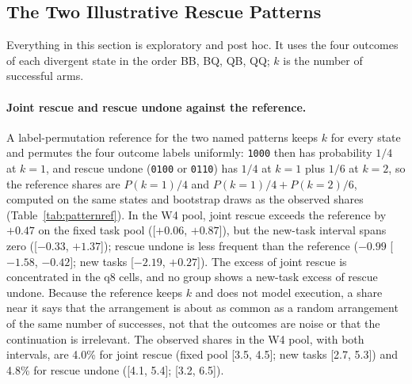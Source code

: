 

\label{app:r2main}

\subsection{The Two Illustrative Rescue Patterns} %
\label{app:offdiag}

Everything in this section is exploratory and post hoc. It uses the four outcomes of each divergent state in the order BB, BQ, QB, QQ; $k$ is the number of successful arms.

\paragraph{Joint rescue and rescue undone against the reference.} A label-permutation reference for the two named patterns keeps $k$ for every state and permutes the four outcome labels uniformly: \texttt{1000} then has probability $1/4$ at $k=1$, and rescue undone (\texttt{0100} or \texttt{0110}) has $1/4$ at $k=1$ plus $1/6$ at $k=2$, so the reference shares are $P(k{=}1)/4$ and $P(k{=}1)/4+P(k{=}2)/6$, computed on the same states and bootstrap draws as the observed shares (Table~\ref{tab:patternref}). In the \tautwo{} W4 pool, joint rescue exceeds the reference by $+0.47$\pp{} on the fixed task pool ([$+0.06$, $+0.87$]), but the new-task interval spans zero ([$-0.33$, $+1.37$]); rescue undone is less frequent than the reference ($-0.99$ [$-1.58$, $-0.42]$; new tasks [$-2.19$, $+0.27$]). The excess of joint rescue is concentrated in the q8 cells, and no group shows a new-task excess of rescue undone. Because the reference keeps $k$ and does not model execution, a share near it says that the arrangement is about as common as a random arrangement of the same number of successes, not that the outcomes are noise or that the continuation is irrelevant. %
The observed shares in the W4 pool, with both intervals, are 4.0\% for joint rescue (fixed pool [3.5, 4.5]; new tasks [2.7, 5.3]) and 4.8\% for rescue undone ([4.1, 5.4]; [3.2, 6.5]). %

